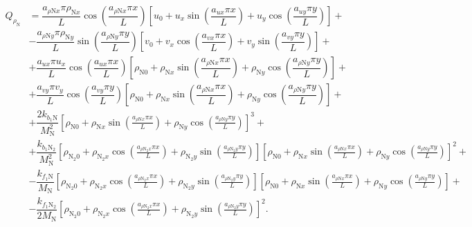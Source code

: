 \documentclass[10pt]{article}
\begin{document}
\begin{landscape}
\begin{equation}
\begin{split}
Q_{\rho_\text{N}} &= \dfrac{a_{ \rho \text{N} x } \pi \rho_{\text{N}x} }{L} \cos\left( \dfrac{a_{ \rho \text{N} x } \pi x}{L}\right) \left[u_0+u_x \sin\left( \dfrac{a_{ux} \pi x}{L}\right)+u_y \cos\left( \dfrac{a_{uy} \pi y}{L}\right)\right] + \\
&- \dfrac{a_{ \rho \text{N} y } \pi \rho_{\text{N} y} }{L}\sin\left( \dfrac{a_{ \rho \text{N} y } \pi y}{L}\right) \left[v_0+v_x \cos\left( \dfrac{a_{vx} \pi x}{L}\right)+v_y \sin\left( \dfrac{a_{vy} \pi y}{L}\right)\right] + \\
&+ \dfrac{ a_{ux} \pi u_x}{L}\cos\left( \dfrac{a_{ux} \pi x}{L}\right) \left[\rho_{\text{N}0}+\rho_{\text{N}x} \sin\left( \dfrac{a_{ \rho \text{N} x } \pi x}{L}\right)+\rho_{\text{N} y} \cos\left( \dfrac{a_{ \rho \text{N} y } \pi y}{L}\right)\right] + \\
&+\dfrac{a_{vy} \pi v_y }{L}\cos\left( \dfrac{a_{vy} \pi y}{L}\right) \left[\rho_{\text{N}0}+\rho_{\text{N}x} \sin\left( \dfrac{a_{ \rho \text{N} x } \pi x}{L}\right)+\rho_{\text{N} y} \cos\left( \dfrac{a_{ \rho \text{N} y } \pi y}{L}\right)\right] + \\
&+ \dfrac{ 2 k_{b_1 \text{N}}}{M_{\text{N}}^2} \left[\rho_{\text{N}0} + \rho_{\text{N}x} \sin\left(\frac{a_{ \rho \text{N} x} \pi x}{L}\right)+ \rho_{\text{N} y} \cos\left(\frac{a_{ \rho \text{N} y} \pi y}{L}\right)\right]^3 +\\
& + \dfrac{ k_{b_1 \text{N}_2}}{M_{\text{N}}^2} \left[\rho_{\text{N}_2 0}+ \rho_{\text{N}_2 x} \cos\left(\frac{a_{ \rho \text{N}_2 x} \pi x}{L}\right)+ \rho_{\text{N}_2 y} \sin\left(\frac{a_{ \rho \text{N}_2 y} \pi y}{L}\right)\right] \left[\rho_{\text{N}0} + \rho_{\text{N}x} \sin\left(\frac{a_{ \rho \text{N} x} \pi x}{L}\right)+ \rho_{\text{N} y} \cos\left(\frac{a_{ \rho \text{N} y} \pi y}{L}\right)\right]^2 +\\
&- \dfrac{ k_{f_1 \text{N}} }{M_{\text{N}}} \left[\rho_{\text{N}_2 0}+ \rho_{\text{N}_2 x} \cos\left(\frac{a_{ \rho \text{N}_2 x} \pi x}{L}\right)+ \rho_{\text{N}_2 y} \sin\left(\frac{a_{ \rho \text{N}_2 y} \pi y}{L}\right)\right] \left[\rho_{\text{N}0} + \rho_{\text{N}x} \sin\left(\frac{a_{ \rho \text{N} x} \pi x}{L}\right)+ \rho_{\text{N} y} \cos\left(\frac{a_{ \rho \text{N} y} \pi y}{L}\right)\right]+\\
&- \dfrac{k_{f_1 \text{N}_2} }{2 M_{\text{N}}} \left[\rho_{\text{N}_2 0}+ \rho_{\text{N}_2 x} \cos\left(\frac{a_{ \rho \text{N}_2 x} \pi x}{L}\right)+ \rho_{\text{N}_2 y} \sin\left(\frac{a_{ \rho \text{N}_2 y} \pi y}{L}\right)\right]^2.
\end{split}
\end{equation}



\end{landscape}
\end{document}
